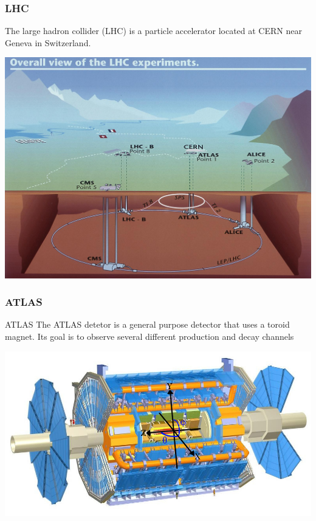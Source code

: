 \documentclass[handout]{beamer}
\begin{document}
\begin{frame}[shrink=10]\frametitle{LHC}
\begin{block}{}
The large hadron collider (LHC) is a particle accelerator located at CERN near Geneva in Switzerland. 
\end{block}
\includegraphics[scale=0.35]{lhc.jpeg}
\end{frame}

\begin{frame}[shrink=10]\frametitle{ATLAS}
\begin{block}{ATLAS}
The ATLAS detetor is a general purpose detector that uses a toroid magnet. Its goal is to observe several different production and decay channels
\end{block}
\includegraphics[scale=0.3]{particle_collider.jpg}
\end{frame}
\end{document}
